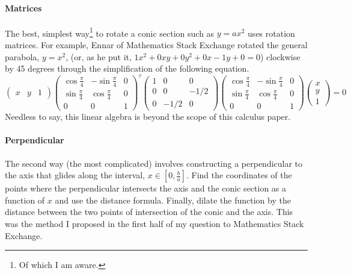 \documentclass{article}
\begin{document}
\paragraph{Matrices} The best, simplest way\footnote{Of which I am aware.} to rotate a conic section such as $y=ax^2$ uses rotation matrices. For example, Ennar of Mathematics Stack Exchange rotated the general parabola, $y=x^2$, (or, as he put it, $1x^2+0xy+0y^2+0x-1y+0=0$) clockwise by 45 degrees through the simplification \cite{BIB:disk1} of the following equation.
$$\begin{pmatrix} x & y & 1 \end{pmatrix}\begin{pmatrix} \cos \frac\pi4& -\sin\frac\pi4 & 0\\ \sin\frac\pi4 & \cos\frac\pi4 & 0\\ 0 & 0 & 1\end{pmatrix}^\tau\begin{pmatrix} 1 & 0 & 0\\ 0 & 0 & -1/2\\ 0 & -1/2 & 0\end{pmatrix}\begin{pmatrix} \cos \frac\pi4& -\sin\frac\pi4& 0\\ \sin\frac\pi4 & \cos\frac\pi4 & 0\\ 0 & 0 & 1\end{pmatrix}\begin{pmatrix} x\\ y\\ 1 \end{pmatrix}=0$$
Needless to say, this linear algebra is beyond the scope of this calculus paper.

\paragraph{Perpendicular} The second way (the most complicated) involves constructing a perpendicular to the axis that glides along the interval, $x\in\left[0,\frac{b}{a}\right]$. Find the coordinates of the points where the perpendicular intersects the axis and the conic section as a function of $x$ and use the distance formula. Finally, dilate the function by the distance between the two points of intersection of the conic and the axis. This was the method I proposed in the first half of my question \cite{BIB:disk2} to Mathematics Stack Exchange.
\end{document}
